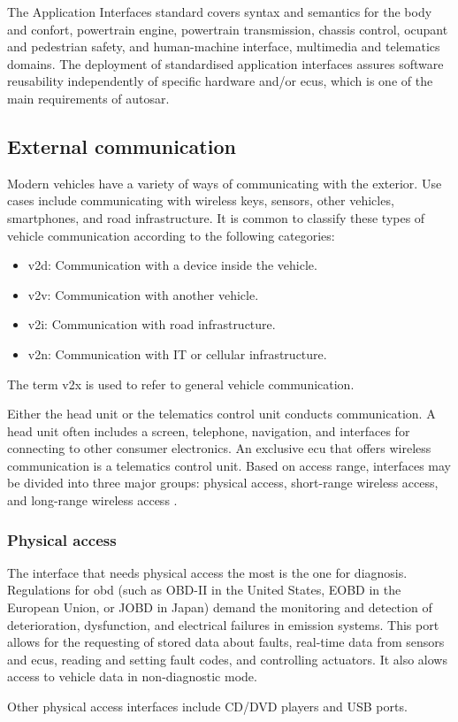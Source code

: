 The Application Interfaces standard covers syntax and semantics for the body and confort, powertrain engine, powertrain transmission, chassis control, ocupant and pedestrian safety, and human-machine interface, multimedia and telematics domains. The deployment of standardised application interfaces assures software reusability independently of specific hardware and/or \glspl{ecu}, which is one of the main requirements of \gls{autosar}.

\subsection{External communication}

Modern vehicles have a variety of ways of communicating with the exterior. Use cases include communicating with wireless keys, sensors, other vehicles, smartphones, and road infrastructure. It is common to classify these types of vehicle communication according to the following categories:

\begin{itemize}
    \item \acrfull{v2d}: Communication with a device inside the vehicle.
    \item \acrfull{v2v}: Communication with another vehicle.
    \item \acrfull{v2i}: Communication with road infrastructure.
    \item \acrfull{v2n}: Communication with IT or cellular infrastructure.
\end{itemize}

The term \acrlong{v2x} is used to refer to general vehicle communication.\par

Either the head unit or the telematics control unit conducts communication. A head unit often includes a screen, telephone, navigation, and interfaces for connecting to other consumer electronics. An exclusive \gls{ecu} that offers wireless communication is a telematics control unit. Based on access range, interfaces may be divided into three major groups: physical access, short-range wireless access, and long-range wireless access \cite{Le2018}.

\subsubsection{Physical access}

The interface that needs physical access the most is the one for diagnosis. Regulations for \gls{obd} (such as OBD-II in the United States, EOBD in the European Union, or JOBD in Japan) demand the monitoring and detection of deterioration, dysfunction, and electrical failures in emission systems. This port allows for the requesting of stored data about faults, real-time data from sensors and \glspl{ecu}, reading and setting fault codes, and controlling actuators. It also alows access to vehicle data in non-diagnostic mode.\par
Other physical access interfaces include CD/DVD players and USB ports.

